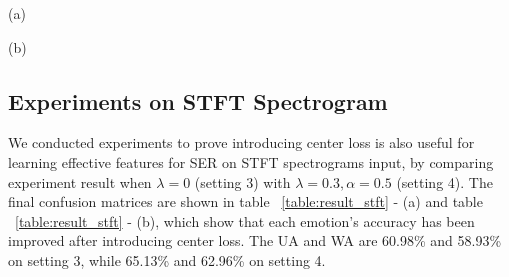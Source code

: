 \documentclass{article}
\begin{document}
\begin{table} [!htp]
	\caption{confusion matrix on, (a) setting 3, (b) setting 4}
	\label{table:result_stft}
	\begin{minipage}[b]{.48\linewidth}
		
		\centerline{
			}
				\vspace{0.5mm}	
				\centerline{(a)  }\medskip
	\end{minipage}
			\hfill
	\begin{minipage}[b]{0.48\linewidth}
				\centerline{
					}
						\vspace{0.5mm}
						\centerline{(b)}\medskip
	\end{minipage}
	
\end{table}				
				
\subsection{Experiments on STFT Spectrogram}
We conducted experiments to prove introducing center loss is also useful for learning effective features for SER on STFT spectrograms input, by comparing experiment result when $\lambda=0$ ({setting 3}) with $\lambda=0.3, \alpha=0.5$ ({setting 4}). The final confusion matrices are shown in table ~\ref{table:result_stft} - (a) and table ~\ref{table:result_stft} - (b), which show that each emotion's accuracy has been improved after introducing center loss. The UA and WA are 60.98\% and 58.93\% on setting 3, while 65.13\% and 62.96\% on setting 4.
\end{document}
